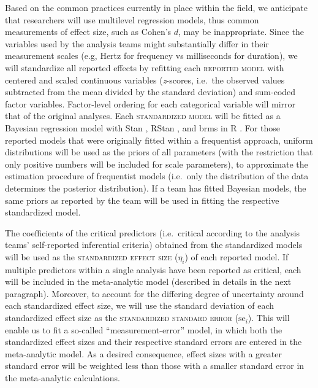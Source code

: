 \documentclass[Review,times,sageh]{sagej}
\begin{document}
Based on the common practices currently in place within the field, we anticipate that researchers will use multilevel regression models, thus common measurements of effect size, such as Cohen's \(d\), may be inappropriate.
Since the variables used by the analysis teams might substantially differ in their measurement scales (e.g, Hertz for frequency vs milliseconds for duration), we will standardize all reported effects by refitting each \textsc{reported model} with centered and scaled continuous variables (\emph{z}-scores, i.e.~the observed values subtracted from the mean divided by the standard deviation) and sum-coded factor variables.
Factor-level ordering for each categorical variable will mirror that of the original analyses.
Each \textsc{standardized model} will be fitted as a Bayesian regression model with Stan \citep{stan2021}, RStan \citep{stan2020a}, and brms \citep{burkner2017} in R \citep{R-base}.
For those reported models that were originally fitted within a frequentist approach, uniform distributions will be used as the priors of all parameters (with the restriction that only positive numbers will be included for scale parameters), to approximate the estimation procedure of frequentist models (i.e.~only the distribution of the data determines the posterior distribution).
If a team has fitted Bayesian models, the same priors as reported by the team will be used in fitting the respective standardized model.

The coefficients of the critical predictors (i.e.~critical according to the analysis teams' self-reported inferential criteria) obtained from the standardized models will be used as the \textsc{standardized effect size} (\(\eta_i\)) of each reported model.
If multiple predictors within a single analysis have been reported as critical, each will be included in the meta-analytic model (described in details in the next paragraph).
Moreover, to account for the differing degree of uncertainty around each standardized effect size, we will use the standard deviation of each standardized effect size as the \textsc{standardized standard error} (\(\text{se}_i\)).
This will enable us to fit a so-called ``measurement-error'' model, in which both the standardized effect sizes and their respective standard errors are entered in the meta-analytic model.
As a desired consequence, effect sizes with a greater standard error will be weighted less than those with a smaller standard error in the meta-analytic calculations.
\end{document}
